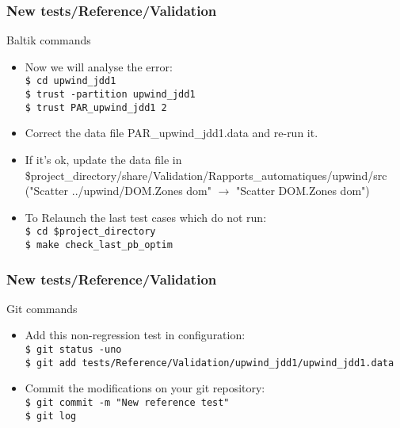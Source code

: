\documentclass[10pt, hyperref={unicode=true,pdfusetitle, bookmarks=true,bookmarksnumbered=false,bookmarksopen=false, breaklinks=false,pdfborder={0 0 1},backref=true,colorlinks=true,linkcolor=darkblue,pageanchor, urlcolor=darkblue}]{beamer}
\begin{document}
\begin{frame}
\frametitle{New tests/Reference/Validation}
\begin{block}{Baltik commands}

\begin{itemize}
\item Now we will analyse the error:\\
\texttt{\$ cd upwind\_jdd1}\\
\texttt{\$ trust -partition upwind\_jdd1}\\
\texttt{\$ trust PAR\_upwind\_jdd1 2}\\
\item Correct the data file PAR\_upwind\_jdd1.data and re-run it.
\item If it's ok, update the data file in 
\$project\_directory/share/Validation/Rapports\_automatiques/upwind/src\\
("Scatter ../upwind/DOM.Zones dom" $\rightarrow$ "Scatter DOM.Zones dom")\\
\item To Relaunch the last test cases which do not run:\\
\texttt{\$ cd \$project\_directory}\\
\texttt{\$ make check\_last\_pb\_optim}\\
\end{itemize}

\end{block}
\end{frame}
\begin{frame}
\frametitle{New tests/Reference/Validation}
\begin{alertblock}{Git commands}

\begin{itemize}
\item Add this non-regression test in configuration:\\
\texttt{\$ git status -uno}\\
\texttt{\$ git add tests/Reference/Validation/upwind\_jdd1/upwind\_jdd1.data}\\
\item Commit the modifications on your git repository:\\
\texttt{\$ git commit -m "New reference test"}\\
\texttt{\$ git log}\\
\end{itemize}

\end{alertblock}
\end{frame}
\end{document}
